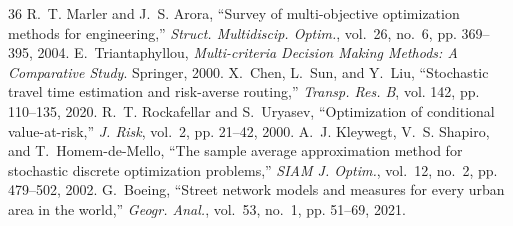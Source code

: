 \documentclass[journal]{IEEEtran}
\begin{document}
\begin{thebibliography}{36}
 R.~T. Marler and J.~S. Arora, ``Survey of multi-objective optimization methods for engineering,'' \emph{Struct. Multidiscip. Optim.}, vol.~26, no.~6, pp. 369--395, 2004.
 E.~Triantaphyllou, \emph{Multi-criteria Decision Making Methods: A Comparative Study}. Springer, 2000.
 X.~Chen, L.~Sun, and Y.~Liu, ``Stochastic travel time estimation and risk-averse routing,'' \emph{Transp. Res. B}, vol. 142, pp. 110--135, 2020.
 R.~T. Rockafellar and S.~Uryasev, ``Optimization of conditional value-at-risk,'' \emph{J. Risk}, vol.~2, pp. 21--42, 2000.
 A.~J. Kleywegt, V.~S. Shapiro, and T.~Homem-de-Mello, ``The sample average approximation method for stochastic discrete optimization problems,'' \emph{SIAM J. Optim.}, vol.~12, no.~2, pp. 479--502, 2002.
 G.~Boeing, ``Street network models and measures for every urban area in the world,'' \emph{Geogr. Anal.}, vol.~53, no.~1, pp. 51--69, 2021.
\end{thebibliography}
\end{document}
